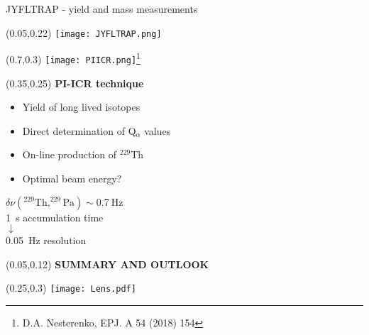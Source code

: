 \documentclass[10pt,aspectratio=169]{beamer}
\begin{document}
\begin{frame}{\qquad JYFLTRAP - yield and mass measurements}
	\begin{textblock*}{0.3\paperwidth}(0.05\paperwidth,0.22\paperheight)
		\texttt{[image: JYFLTRAP.png]}
	\end{textblock*}
	\begin{textblock*}{0.25\paperwidth}(0.7\paperwidth,0.3\paperheight)
		\texttt{[image: PIICR.png]}\footnote{D.A. Nesterenko, EPJ. A 54 (2018) 154}
	\end{textblock*}
	\begin{textblock*}{0.3\paperwidth}(0.35\paperwidth,0.25\paperheight)
		\centering
		\textbf{PI-ICR technique}
		\begin{itemize}
			\item Yield of long lived isotopes
			\item Direct determination of Q$_{\alpha}$ values
			\item On-line production of $^{229}$Th
			\item Optimal beam energy?
		\end{itemize}
		\vspace{0.05\textheight}
		$\delta \nu (^{229}\text{Th},^{229}\text{Pa})\sim 0.7\ \text{Hz}$\\
		\vspace{0.0\textheight}
		1~s accumulation time\\ $\downarrow$\\ 0.05~Hz resolution		
	\end{textblock*}
\end{frame}

\begin{SectionTitle}
	\begin{frame}
		\centering
		\begin{textblock*}{0.9\paperwidth}(0.05\paperwidth,0.12\paperheight)
			\centering
			\textbf{\LARGE SUMMARY AND OUTLOOK}	
		\end{textblock*}
		\begin{textblock*}{0.5\paperwidth}(0.25\paperwidth,0.3\paperheight)
			\texttt{[image: Lens.pdf]}
		\end{textblock*}
	\end{frame}
\end{SectionTitle}
\end{document}
